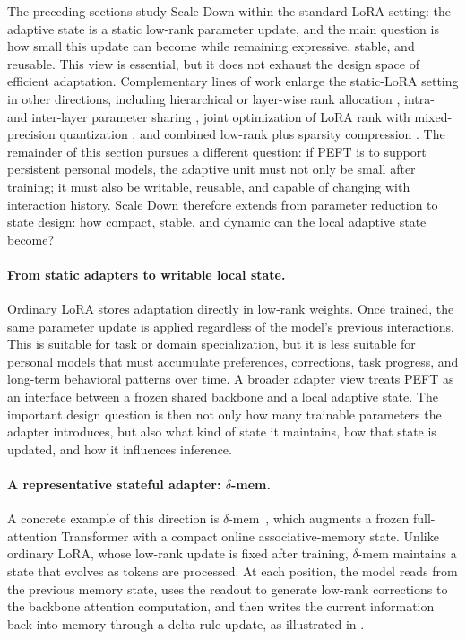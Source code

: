 The preceding sections study Scale Down within the standard LoRA setting: the adaptive state is a static low-rank parameter update, and the main question is how small this update can become while remaining expressive, stable, and reusable. This view is essential, but it does not exhaust the design space of efficient adaptation. Complementary lines of work enlarge the static-LoRA setting in other directions, including hierarchical or layer-wise rank allocation \citep{zhou2025rankadaptor,zhou2026lara}, intra- and inter-layer parameter sharing \citep{zhou2025bslora}, joint optimization of LoRA rank with mixed-precision quantization \citep{zhou2025balancing,zhou2026autoqra}, and combined low-rank plus sparsity compression \citep{zhou2025largecompression}. The remainder of this section pursues a different question: if PEFT is to support persistent personal models, the adaptive unit must not only be small after training; it must also be writable, reusable, and capable of changing with interaction history. Scale Down therefore extends from parameter reduction to state design: how compact, stable, and dynamic can the local adaptive state become?

\paragraph{From static adapters to writable local state.}
Ordinary LoRA stores adaptation directly in low-rank weights. Once trained, the same parameter update is applied regardless of the model's previous interactions. This is suitable for task or domain specialization, but it is less suitable for personal models that must accumulate preferences, corrections, task progress, and long-term behavioral patterns over time. A broader adapter view treats PEFT as an interface between a frozen shared backbone and a local adaptive state. The important design question is then not only how many trainable parameters the adapter introduces, but also what kind of state it maintains, how that state is updated, and how it influences inference.

\paragraph{A representative stateful adapter: $\delta$-mem.}
A concrete example of this direction is $\delta$-mem~\citep{lei2026deltamem}, which augments a frozen full-attention Transformer with a compact online associative-memory state. Unlike ordinary LoRA, whose low-rank update is fixed after training, $\delta$-mem maintains a state that evolves as tokens are processed. At each position, the model reads from the previous memory state, uses the readout to generate low-rank corrections to the backbone attention computation, and then writes the current information back into memory through a delta-rule update, as illustrated in .

